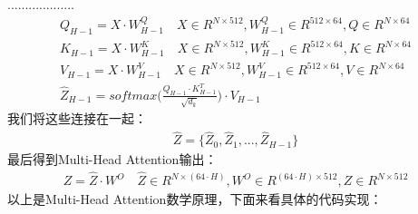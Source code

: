 \documentclass{article}
\begin{document}
...................
\begin{equation}
\begin{aligned}
Q_{H-1} = X \cdot W^{Q}_{H-1} \quad X \in R^{N \times 512}, W^{Q}_{H-1} \in R^{512 \times 64}, Q \in R^{N \times 64} \\
K_{H-1} = X \cdot W^{K}_{H-1} \quad X \in R^{N \times 512}, W^{K}_{H-1} \in R^{512 \times 64}, K \in R^{N \times 64} \\
V_{H-1} = X \cdot W^{V}_{H-1} \quad X \in R^{N \times 512}, W^{V}_{H-1} \in R^{512 \times 64}, V \in R^{N \times 64} \\
\hat{Z}_{H-1} = softmax \bigg( \frac{Q_{H-1} \cdot K^{T}_{H-1}}{\sqrt{d_{k}}} \bigg) \cdot V_{H-1}
\end{aligned}
\label{e000115}
\end{equation}
我们将这些连接在一起：
\begin{equation}
\begin{aligned}
\hat{Z} = \{ \hat{Z}_{0}, \hat{Z}_{1}, ..., \hat{Z}_{H-1} \}
\end{aligned}
\label{e000116}
\end{equation}
最后得到Multi-Head Attention输出：
\begin{equation}
\begin{aligned}
Z = \hat{Z} \cdot W^{O} \quad \hat{Z} \in R^{N \times (64 \cdot H)}, W^{O} \in R^{(64 \cdot H) \times 512}, Z \in R^{N \times 512}
\end{aligned}
\label{e000117}
\end{equation}
以上是Multi-Head Attention数学原理，下面来看具体的代码实现：
\end{document}

